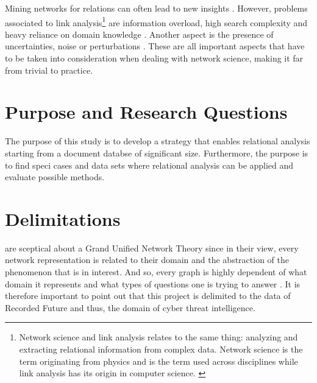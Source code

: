 Mining networks for relations can often lead to new insights \cite{hendrix2010}. However, problems associated to link analysis\footnote{Network science and link analysis relates to the same thing: analyzing and extracting relational information from complex data. Network science is the term originating from physics and is the term used across disciplines while link analysis has its origin in computer science. \cite{fouss2016algorithms}} are information overload, high search complexity and heavy reliance on domain knowledge \cite{hendrix2010,schroeder2007}. Another aspect is the presence of uncertainties, noise or perturbations \cite{hendrix2010}. These are all important aspects that have to be taken into consideration when dealing with network science, making it far from trivial to practice. 

\section{Purpose and Research Questions}

The purpose of this study is to develop a strategy that enables relational analysis starting from a document databse of significant size. Furthermore, the purpose is to find speci cases and data sets where relational analysis can be applied and evaluate possible methods.

\begin{comment}
The purpose of this study is to investigate the possibility to transform a database into a relational based graph database in order to reveal new relations and draw more conclusions about the existing data. The purpose can be broken down into the following three research questions:
\begin{enumerate}
	\item Are there classes or specific types of relations that are of special significance for cyber threat analysis?
    \item What kind of network analysis and statistics is important when performing cyber threat analysis?
    \item What methodology and design is suitable for extracting hidden relations in a big database within reasonable execution time?
\end{enumerate}
\end{comment}

\section{Delimitations}
\citet{brandes2013} are sceptical about a Grand Unified Network Theory since in their view, every network representation is related to their domain and the abstraction of the phenomenon that is in interest. And so, every graph is highly dependent of what domain it represents and what types of questions one is trying to answer \cite{hendrix2010, schroeder2007}. It is therefore important to point out that this project is delimited to the data of Recorded Future and thus, the domain of cyber threat intelligence. 

